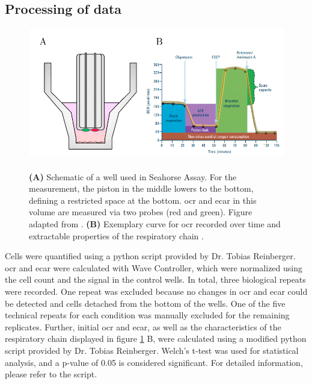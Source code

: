     \subsection{Processing of data}
    \begin{figure}[h]
    \capstart
        \centering
        \includegraphics{Abbildung/seahorse_basics_placeholder.pdf}

        \begin{minipage}{\captionwidth}
            \caption[enrichment]{\\
            \textbf{(A)} Schematic of a well used in Seahorse Assay. For the measurement, the piston in the middle lowers to the bottom, defining a restricted space at the bottom. \ac{ocr} and \ac{ecar} in this volume are measured via two probes (red and green). Figure adapted from \cite{agilenttechnologiesincHowAgilentSeahorse2022}. \textbf{(B)} Exemplary curve for \ac{ocr} recorded over time and extractable properties of the respiratory chain \cite{agilenttechnologiesinc.AGILENTSeahorseXF2020}.}
            \label{fig:seahorse_basics}
        \end{minipage}
    \end{figure}

    Cells were quantified using a python script provided by Dr. Tobias Reinberger. \ac{ocr} and \ac{ecar} were calculated with Wave Controller, which were normalized using the cell count and the signal in the control wells. In total, three biological repeats were recorded. One repeat was excluded because no changes in \ac{ocr} and \ac{ecar} could be detected and cells detached from the bottom of the wells. One of the five technical repeats for each condition was manually excluded for the remaining replicates. Further, initial \ac{ocr} and \ac{ecar}, as well as the characteristics of the respiratory chain displayed in figure \ref{fig:seahorse_basics} B, were calculated using a modified python script provided by Dr. Tobias Reinberger. Welch’s t-test was used for statistical analysis, and a p-value of 0.05 is considered significant. For detailed information, please refer to the script.

